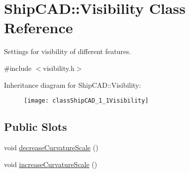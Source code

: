 \hypertarget{classShipCAD_1_1Visibility}{}\section{Ship\+C\+AD\+:\+:Visibility Class Reference}
\label{classShipCAD_1_1Visibility}


Settings for visibility of different features.  




{\ttfamily \#include $<$visibility.\+h$>$}

Inheritance diagram for Ship\+C\+AD\+:\+:Visibility\+:\begin{figure}[H]
\begin{center}
\leavevmode
\texttt{[image: classShipCAD\_1\_1Visibility]}
\end{center}
\end{figure}
\subsection*{Public Slots}
\begin{DoxyCompactItemize}
\item 
void \hyperlink{classShipCAD_1_1Visibility_aa9ff89a0d825c2e5ac3fe9c08da9daec}{decrease\+Curvature\+Scale} ()
\item 
void \hyperlink{classShipCAD_1_1Visibility_af8ff6d1f77f64179f186a200ef7d056c}{increase\+Curvature\+Scale} ()
\end{DoxyCompactItemize}
